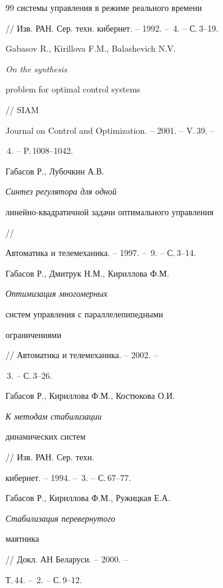 \begin{thebibliography}{99}
{системы управления в режиме реального времени}


// Изв. РАН. Сер. техн. кибернет. -- 1992. -- \No\,4. -- С.\,3--19.







Gabasov R., Kirillova F.M., Balashevich N.V. {\it On the synthesis


problem for optimal control systems} // SIAM


Journal on Control and Optimization. -- 2001. -- V.\,39. --


\No\,4. -- P.\,1008--1042.







Габасов Р., Лубочкин А.В. {\it Синтез регулятора для одной 


линейно-квадратичной задачи оптимального управления} //


Автоматика и телемеханика. -- 1997. -- \No\,9. -- С.\,3--14.







Габасов Р., Дмитрук Н.М., Кириллова Ф.М. {\it Оптимизация многомерных


систем управления с параллелепипедными


ограничениями} // Автоматика и телемеханика. -- 2002. --


\No\,3. -- С.\,3--26.







Габасов Р., Кириллова Ф.М., Костюкова О.И. {\it К методам стабилизации


динамических систем} // Изв. РАН. Сер. техн.


кибернет. -- 1994. -- \No\,3. -- С.\,67--77.







Габасов Р., Кириллова Ф.М., Ружицкая Е.А. {\it Стабилизация перевернутого


маятника} // Докл. АН Беларуси. -- 2000. --


Т.\,44. -- \No\,2. -- С.\,9--12.








\end{thebibliography}
